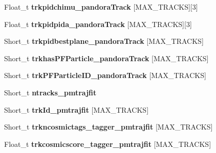 \begin{DoxyCompactItemize}
\item 
\hypertarget{classanatree_a9d167b902c1054222e86725b09ec5829}{Float\-\_\-t {\bfseries trkpidchimu\-\_\-pandora\-Track} \mbox{[}M\-A\-X\-\_\-\-T\-R\-A\-C\-K\-S\mbox{]}\mbox{[}3\mbox{]}}\label{classanatree_a9d167b902c1054222e86725b09ec5829}

\item 
\hypertarget{classanatree_ac41f2bcea1bd90c759c8b1442bd08b00}{Float\-\_\-t {\bfseries trkpidpida\-\_\-pandora\-Track} \mbox{[}M\-A\-X\-\_\-\-T\-R\-A\-C\-K\-S\mbox{]}\mbox{[}3\mbox{]}}\label{classanatree_ac41f2bcea1bd90c759c8b1442bd08b00}

\item 
\hypertarget{classanatree_ae128446738d35991ed6e5769c7237527}{Short\-\_\-t {\bfseries trkpidbestplane\-\_\-pandora\-Track} \mbox{[}M\-A\-X\-\_\-\-T\-R\-A\-C\-K\-S\mbox{]}}\label{classanatree_ae128446738d35991ed6e5769c7237527}

\item 
\hypertarget{classanatree_a3d73017e5943a039c29b4af9bc7e7a3d}{Short\-\_\-t {\bfseries trkhas\-P\-F\-Particle\-\_\-pandora\-Track} \mbox{[}M\-A\-X\-\_\-\-T\-R\-A\-C\-K\-S\mbox{]}}\label{classanatree_a3d73017e5943a039c29b4af9bc7e7a3d}

\item 
\hypertarget{classanatree_a3edd8410cece1ec89caa7c2800a746f3}{Short\-\_\-t {\bfseries trk\-P\-F\-Particle\-I\-D\-\_\-pandora\-Track} \mbox{[}M\-A\-X\-\_\-\-T\-R\-A\-C\-K\-S\mbox{]}}\label{classanatree_a3edd8410cece1ec89caa7c2800a746f3}

\item 
\hypertarget{classanatree_a599451e03494f8dd8e157c5d78ddd6e2}{Short\-\_\-t {\bfseries ntracks\-\_\-pmtrajfit}}\label{classanatree_a599451e03494f8dd8e157c5d78ddd6e2}

\item 
\hypertarget{classanatree_a458e0b93db2bd382d4d6ee451fd332e8}{Short\-\_\-t {\bfseries trk\-Id\-\_\-pmtrajfit} \mbox{[}M\-A\-X\-\_\-\-T\-R\-A\-C\-K\-S\mbox{]}}\label{classanatree_a458e0b93db2bd382d4d6ee451fd332e8}

\item 
\hypertarget{classanatree_a0b0cb717611cbc15d4f5758e3949d410}{Short\-\_\-t {\bfseries trkncosmictags\-\_\-tagger\-\_\-pmtrajfit} \mbox{[}M\-A\-X\-\_\-\-T\-R\-A\-C\-K\-S\mbox{]}}\label{classanatree_a0b0cb717611cbc15d4f5758e3949d410}

\item 
\hypertarget{classanatree_a63d3c200d7638641c0a242f46a910dd0}{Float\-\_\-t {\bfseries trkcosmicscore\-\_\-tagger\-\_\-pmtrajfit} \mbox{[}M\-A\-X\-\_\-\-T\-R\-A\-C\-K\-S\mbox{]}}\label{classanatree_a63d3c200d7638641c0a242f46a910dd0}


\end{DoxyCompactItemize}
